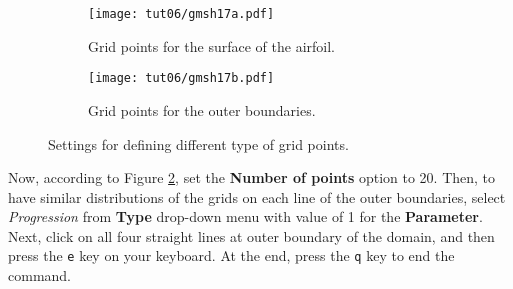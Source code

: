 \begin{figure}[htbp]
    \centering
     \begin{subfigure}[b]{.4\textwidth}
         \centering
         \texttt{[image: tut06/gmsh17a.pdf]}
         \caption{Grid points for the surface of the airfoil.}
         \label{fig6:gmsh17 a}
     \end{subfigure}
     \hfill
     \begin{subfigure}[b]{.4\textwidth}
         \centering
         \texttt{[image: tut06/gmsh17b.pdf]}
         \caption{Grid points for the outer boundaries.}
         \label{fig6:gmsh17 b}
     \end{subfigure}  
    \caption{Settings for defining different type of grid points.}
    \label{fig6:gmsh17}
\end{figure}
Now, according to Figure \ref{fig6:gmsh17 b}, set the \textbf{Number of points} option to 20. Then, to have similar distributions of the grids on each line of the outer boundaries, select \textit{Progression} from \textbf{Type} drop-down menu with value of 1 for the \textbf{Parameter}. Next, click on all four straight lines at outer boundary of the domain, and then press the \texttt{e} key on your keyboard. At the end, press the \texttt{q} key to end the command.

